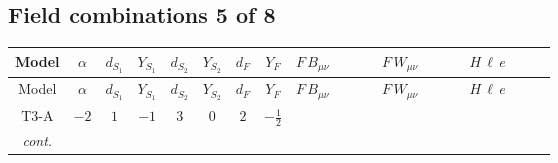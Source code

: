 \documentclass[8pt]{article}
\begin{document}
\begin{landscape}
\subsection*{Field combinations 5 of 8}
\begin{longtable}{@{}cccccccc >{\raggedright\arraybackslash}p{0.21\linewidth} >{\raggedright\arraybackslash}p{0.21\linewidth} >{\raggedright\arraybackslash}p{0.21\linewidth}@{}}
\toprule
Model & $\alpha$ & $d_{S_1}$ & $Y_{S_1}$ & $d_{S_2}$ & $Y_{S_2}$ & $d_F$ & $Y_F$ & $F\,B_{\mu\nu}$ & $F\,W_{\mu\nu}$ & $H\,\ell\,e$ \\
\midrule
\endfirsthead
\toprule
Model & $\alpha$ & $d_{S_1}$ & $Y_{S_1}$ & $d_{S_2}$ & $Y_{S_2}$ & $d_F$ & $Y_F$ & $F\,B_{\mu\nu}$ & $F\,W_{\mu\nu}$ & $H\,\ell\,e$ \\
\midrule
\endhead
T3-A & $-2$ & $1$ & $-1$ & $3$ & $0$ & $2$ & $-\frac{1}{2}$ & \scriptsize\adjustbox{max width=\linewidth}{$\begin{gathered} -\frac{1}{2} \hbar  \log \left(\frac{\bar{\mu}^{2}}{M_F^2}\right) B_{\mu _1\mu _2}^2\end{gathered}$} & \scriptsize\adjustbox{max width=\linewidth}{$\begin{gathered} -\frac{1}{2} \hbar  \log \left(\frac{\bar{\mu}^{2}}{M_F^2}\right) \left(W_{\mu _1\mu _2}^{A_1}\right){}^2\end{gathered}$} & \scriptsize\adjustbox{max width=\linewidth}{$\begin{gathered} +\frac{\hbar  \overline{y_{1,i_3,r_1}} \overline{L_{a_1,i_2}}\, P_R\, e_{i_1} H_{a_1} y_{1,i_2,r_1} Y_{e,i_3,i_1}}{4 \epsilon } \\ +\frac{3}{8} \hbar  \overline{y_{1,i_3,r_1}} \overline{L_{a_1,i_2}}\, P_R\, e_{i_1} H_{a_1} y_{1,i_2,r_1} Y_{e,i_3,i_1} \\ +\frac{\sqrt{3} \hbar  \overline{y_{2,i_3,r_1}} \overline{L_{a_1,i_2}}\, P_R\, e_{i_1} H_{a_1} y_{2,i_2,r_1} Y_{e,i_3,i_1}}{4 \epsilon }\end{gathered}$} \\
\textit{cont.} &  &  &  &  &  &  &  &  &  & \scriptsize\adjustbox{max width=\linewidth}{$\begin{gathered} +\frac{3}{8} \sqrt{3} \hbar  \overline{y_{2,i_3,r_1}} \overline{L_{a_1,i_2}}\, P_R\, e_{i_1} H_{a_1} y_{2,i_2,r_1} Y_{e,i_3,i_1} \\ +\frac{\hbar  \overline{y_{1,i_1,r_1}} \overline{Y_{e,i_3,i_2}} \overline{e_{i_2}}\, P_L\, L_{a_1,i_1} y_{1,i_3,r_1} H_{a_1}{}^{\dagger }}{4 \epsilon } \\ +\frac{3}{8} \hbar  \overline{y_{1,i_1,r_1}} \overline{Y_{e,i_3,i_2}} \overline{e_{i_2}}\, P_L\, L_{a_1,i_1} y_{1,i_3,r_1} H_{a_1}{}^{\dagger }\end{gathered}$} \\

\end{longtable}
\end{landscape}
\end{document}
